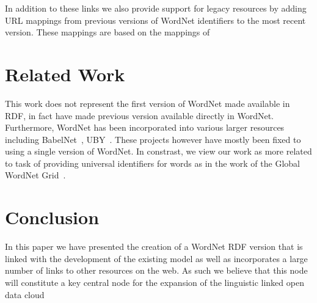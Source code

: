 \documentclass[10pt, a4paper]{article}
\begin{document}
In addition to these links we also provide support for legacy resources by
adding URL mappings from previous versions of WordNet identifiers to the most
recent version. These mappings are based on the mappings of \cite{}

\section{Related Work}

This work does not represent the first version of WordNet made available in RDF,
in fact \cite{van2006conversion,mccrae2012integrating} have made previous
version available directly in WordNet. Furthermore, WordNet has been
incorporated into various larger resources including
BabelNet~\cite{navigli2010babelnet,ehrmann2014},
UBY~\cite{gurevych2012uby,eckle2014lemonuby}. These projects however have mostly
been fixed to using a single version of WordNet. In constrast, we view our work
as more related to task of providing universal identifiers for words as in the
work of the Global WordNet Grid~\cite{pease2008building}.  

\section{Conclusion}

In this paper we have presented the creation of a WordNet RDF version that is
linked with the development of the existing model as well as incorporates a
large number of links to other resources on the web. As such we believe that
this node will constitute a key central node for the expansion of the linguistic
linked open data cloud



\end{document}

